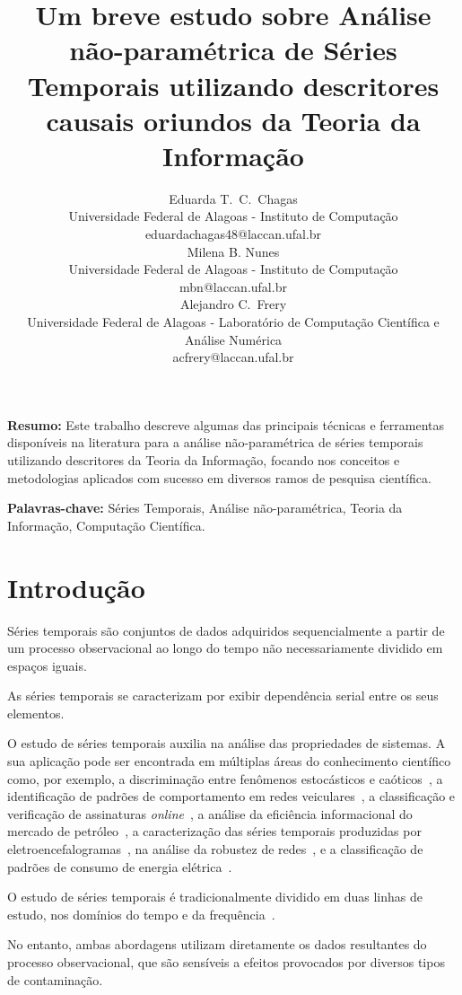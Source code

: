 \documentclass[12pt]{article}
\title{\large \textbf{Um breve estudo sobre Análise não-paramétrica de Séries Temporais utilizando descritores causais oriundos da Teoria da Informação}}
\author{\myfont Eduarda T.\ C.\ Chagas \\ \myfont Universidade Federal de Alagoas - Instituto de Computação \\  \myfont eduardachagas48@laccan.ufal.br \\
 \myfont Milena B. Nunes \\ \myfont Universidade Federal de Alagoas - Instituto de Computação \\ \myfont mbn@laccan.ufal.br \\
 \myfont Alejandro C.\ Frery \\ \myfont Universidade Federal de Alagoas - Laboratório de Computação Científica e Análise Numérica \\ \myfont acfrery@laccan.ufal.br \\}
\date{}
\begin{document}
\raggedright
\maketitle
\thispagestyle{empty}
\pagestyle{empty}

\textbf{Resumo:} Este trabalho descreve algumas das principais técnicas e ferramentas disponíveis na literatura para a análise não-paramétrica de séries temporais utilizando descritores da Teoria da Informação, focando nos conceitos e metodologias aplicados com sucesso em diversos ramos de pesquisa científica.

\textbf{Palavras-chave:} Séries Temporais, Análise não-paramétrica, Teoria da Informação, Computação Científica.

 
\section*{Introdução}

Séries temporais são conjuntos de dados adquiridos sequencialmente a partir de um processo observacional ao longo do tempo não necessariamente dividido em espaços iguais.

As séries temporais se caracterizam por exibir dependência serial entre os seus elementos.

O estudo de séries temporais auxilia na análise das propriedades de sistemas.
A sua aplicação pode ser encontrada em múltiplas áreas do conhecimento científico como, por exemplo,
a discriminação entre fenômenos estocásticos e caóticos~\cite{DistinguishingNoiseFromChaos}, 
a identificação de padrões de comportamento em redes veiculares~\cite{CharacterizationVehicleBehaviorInformationTheory}, 
a classificação e verificação de assinaturas \textit{online}~\cite{ClassificationVerificationOnlineHandwrittenSignatures},
a análise da eficiência informacional do mercado de petróleo~\cite{oilMarket},
a caracterização das séries temporais produzidas por eletroencefalogramas~\cite{EGGTimeSeries},
na análise da robustez de redes~\cite{InformationTheoryPerspectiveNetworkRobustness}, e 
a classificação de padrões de consumo de energia elétrica~\cite{CharacterizationElectricLoadInformationTheoryQuantifiers}.

O estudo de séries temporais é tradicionalmente dividido em duas linhas de estudo, nos domínios do tempo e da frequência~\cite{BrockwellDavis91}.

No entanto, ambas abordagens utilizam diretamente os dados resultantes do processo observacional, que são sensíveis a efeitos provocados por diversos tipos de contaminação.
\end{document}
